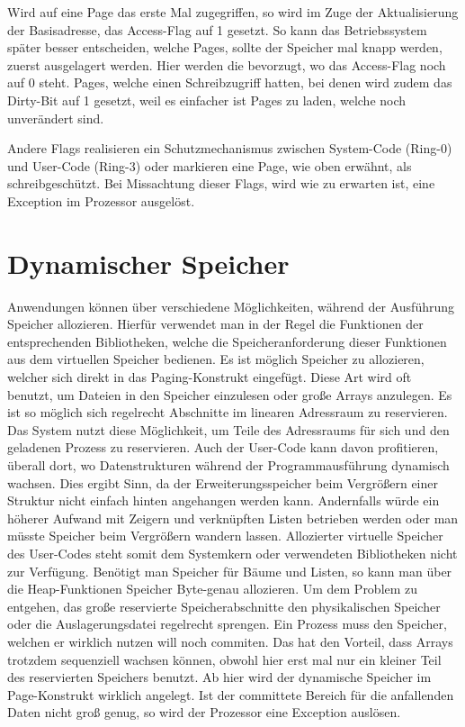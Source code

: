 \documentclass[12pt]{book}
\begin{document}
Wird auf eine Page das erste Mal zugegriffen, so wird im Zuge der
Aktualisierung der Basisadresse, das Access-Flag auf 1 gesetzt.  So kann das
Betriebssystem später besser entscheiden, welche Pages, sollte der Speicher mal
knapp werden, zuerst ausgelagert werden. Hier werden die bevorzugt, wo das
Access-Flag noch auf 0 steht. Pages, welche einen Schreibzugriff hatten, bei
denen wird zudem das Dirty-Bit auf 1 gesetzt, weil es einfacher ist Pages zu
laden, welche noch unverändert sind.

Andere Flags realisieren ein Schutzmechanismus zwischen System-Code (Ring-0)
und User-Code (Ring-3) oder markieren eine Page, wie oben erwähnt, als
schreibgeschützt. Bei Missachtung dieser Flags, wird wie zu erwarten ist, eine
Exception im Prozessor ausgelöst.

\section{Dynamischer Speicher}

Anwendungen können über verschiedene Möglichkeiten, während der Ausführung
Speicher allozieren. Hierfür verwendet man in der Regel die Funktionen der
entsprechenden Bibliotheken, welche die Speicheranforderung dieser Funktionen
aus dem virtuellen Speicher bedienen. Es ist möglich Speicher zu allozieren,
welcher sich direkt in das Paging-Konstrukt eingefügt. Diese Art wird oft
benutzt, um Dateien in den Speicher einzulesen oder große Arrays anzulegen. Es
ist so möglich sich regelrecht Abschnitte im linearen Adressraum zu reservieren.
Das System nutzt diese Möglichkeit, um Teile des Adressraums für sich und den
geladenen Prozess zu reservieren. Auch der User-Code kann davon profitieren,
überall dort, wo Datenstrukturen während der Programmausführung dynamisch
wachsen. Dies ergibt Sinn, da der Erweiterungsspeicher beim Vergrößern einer
Struktur nicht einfach hinten angehangen werden kann. Andernfalls würde ein
höherer Aufwand mit Zeigern und verknüpften Listen betrieben werden oder man
müsste Speicher beim Vergrößern wandern lassen. Allozierter virtuelle Speicher
des User-Codes steht somit dem Systemkern oder verwendeten Bibliotheken nicht
zur Verfügung. Benötigt man Speicher für Bäume und Listen, so kann man über die
Heap-Funktionen Speicher Byte-genau allozieren. Um dem Problem zu entgehen, das
große reservierte Speicherabschnitte den physikalischen Speicher oder die
Auslagerungsdatei regelrecht sprengen. Ein Prozess muss den Speicher, welchen er
wirklich nutzen will noch commiten. Das hat den Vorteil, dass Arrays trotzdem
sequenziell wachsen können, obwohl hier erst mal nur ein kleiner Teil des
reservierten Speichers benutzt. Ab hier wird der dynamische Speicher im
Page-Konstrukt wirklich angelegt. Ist der committete Bereich für die anfallenden
Daten nicht groß genug, so wird der Prozessor eine Exception auslösen.
\end{document}

